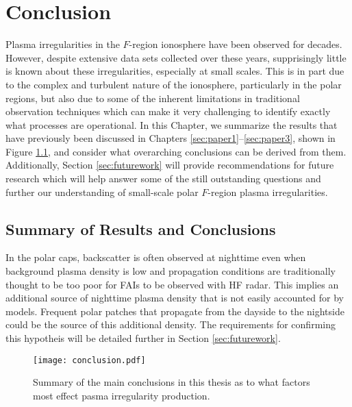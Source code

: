 
\chapter{Conclusion}
\label{sec:conclusion}

Plasma irregularities in the \(F\)-region ionosphere have been observed for decades.  However, despite extensive data sets collected over these years, supprisingly little is known about these irregularities, especially at small scales.  This is in part due to the complex and turbulent nature of the ionosphere, particularly in the polar regions, but also due to some of the inherent limitations in traditional observation techniques which can make it very challenging to identify exactly what processes are operational.  In this Chapter, we summarize the results that have previously been discussed in Chapters \ref{sec:paper1}--\ref{sec:paper3}, shown in Figure \ref{fig:conclusion}, and consider what overarching conclusions can be derived from them.  Additionally, Section \ref{sec:futurework} will provide recommendations for future research which will help answer some of the still outstanding questions and further our understanding of small-scale polar \(F\)-region plasma irregularities.

\section{Summary of Results and Conclusions}
\label{sec:summary}

In the polar caps, backscatter is often observed at nighttime even when background plasma density is low and propagation conditions are traditionally thought to be too poor for FAIs to be observed with HF radar.  This implies an additional source of nighttime plasma density that is not easily accounted for by models.  Frequent polar patches that propagate from the dayside to the nightside could be the source of this additional density.  The requirements for confirming this hypotheis will be detailed further in Section \ref{sec:futurework}.

\begin{figure}
  \texttt{[image: conclusion.pdf]}
  \caption[Irregularity production factors]{Summary of the main conclusions in this thesis as to what factors most effect pasma irregularity production.}
  \label{fig:conclusion}
\end{figure}

